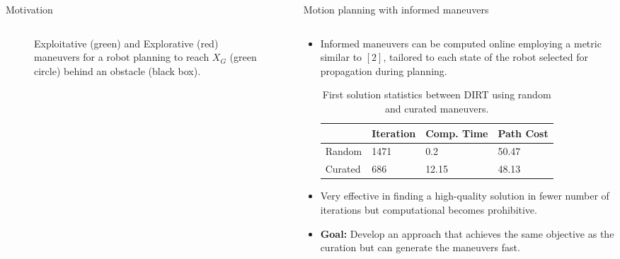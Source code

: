 \begin{columns}[t]
\begin{column}{0.50\textwidth}
\begin{block}{\large Motivation}
\begin{columns}[t]
\begin{column}{0.35\textwidth}
\begin{figure}
					\caption{Exploitative (green) and Explorative (red) maneuvers for a robot planning to reach $X_G$ (green circle) behind an obstacle (black box). \vspace{-.2in}}
					\end{figure}
			    \end{column}
		    \end{columns}
		\end{block}
	\end{column}
	\begin{column}{0.50\textwidth}
		\begin{block}{\large Motion planning with informed maneuvers}
		    \begin{columns}[T]
		    	\begin{column}{0.98\textwidth}
					\begin{itemize}
						\item Informed maneuvers can be computed online employing a metric similar to $[2]$, tailored to each state of the robot selected for propagation during planning. \vspace{0.1in}
						\begin{table}[h!]
						\centering
						\begin{tabular}{|l|l|l|l|}
						\hline
						        & \textbf{Iteration} & \textbf{Comp. Time} & \textbf{Path Cost} \\ [0.5ex] \hline
						Random  & 1471                    & 0.2                   & 50.47                  \\ \hline
						Curated & 686                    & 12.15                & 48.13                  \\ \hline
						\end{tabular}
						\caption{First solution statistics between DIRT using random and curated maneuvers.}
						\label{table:Rastar}
						\vspace{0.1in}
					\end{table}
						\item Very effective in finding a high-quality solution in fewer number of iterations but computational becomes prohibitive.
						\item \textbf{Goal:} Develop an approach that achieves the same objective as the curation but can generate the maneuvers fast.

\end{itemize}
\end{column}
\end{columns}
\end{block}
\end{column}
\end{columns}

